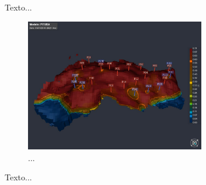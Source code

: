 Texto...

\begin{figure}[h]
	\centering
	\includegraphics[width=0.7\textwidth]{images/pituba}
	\caption{...}
\end{figure}

Texto...